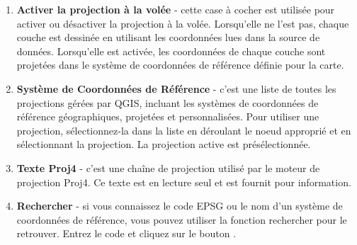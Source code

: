 \begin{enumerate}
\item \textbf{Activer la projection \`a la vol\'ee} -
cette case \`a cocher est utilis\'ee pour activer ou d\'esactiver la projection \`a la
vol\'ee. Lorsqu'elle ne l'est pas, chaque couche est dessin\'ee en utilisant les
coordonn\'ees lues dans la source de donn\'ees. Lorsqu'elle est activ\'ee, les
coordonn\'ees de chaque couche sont projet\'ees dans le syst\`eme de coordonn\'ees de
r\'ef\'erence d\'efinie pour la carte.
\item \textbf{Syst\`eme de Coordonn\'ees de R\'ef\'erence} - c'est une liste de toutes
les projections g\'er\'ees par QGIS, incluant les syst\`emes de coordonn\'ees
de r\'ef\'erence g\'eographiques, projet\'ees et personnalis\'ees. Pour utiliser une
projection, s\'electionnez-la dans la liste en d\'eroulant le noeud appropri\'e et en
s\'electionnant la projection. La projection active est pr\'es\'electionn\'ee.
\item \textbf{Texte Proj4} - c'est une cha\^ine de projection utilis\'e par le
moteur de projection Proj4. Ce texte est en lecture seul et est fournit pour
information.
\item \textbf{Rechercher} - si vous connaissez le code EPSG ou le nom d'un
syst\`eme de coordonn\'ees de r\'ef\'erence, vous pouvez utiliser la fonction
rechercher pour le retrouver. Entrez le code et cliquez sur le bouton
.
\end{enumerate}

